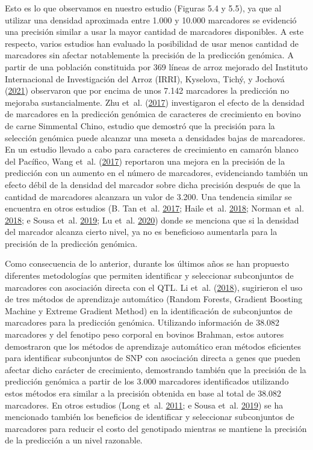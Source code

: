 \documentclass[11pt,spanish,a4paper,oneside,]{book} %
\begin{document}
Esto es lo que observamos en nuestro estudio (Figuras 5.4 y 5.5), ya que al utilizar una densidad aproximada entre 1.000 y 10.000 marcadores se evidenció una precisión similar a usar la mayor cantidad de marcadores disponibles. A este respecto, varios estudios han evaluado la posibilidad de usar menos cantidad de marcadores sin afectar notablemente la precisión de la predicción genómica. A partir de una población constituida por 369 líneas de arroz mejorado del Instituto Internacional de Investigación del Arroz (IRRI), Kyselova, Tichý, y Jochová (\protect\hyperlink{ref-cite:32}{2021}) observaron que por encima de unos 7.142 marcadores la predicción no mejoraba sustancialmente. Zhu et~al. (\protect\hyperlink{ref-cite:83}{2017}) investigaron el efecto de la densidad de marcadores en la predicción genómica de caracteres de crecimiento en bovino de carne Simmental Chino, estudio que demostró que la precisión para la selección genómica puede alcanzar una meseta a densidades bajas de marcadores. En un estudio llevado a cabo para caracteres de crecimiento en camarón blanco del Pacífico, Wang et~al. (\protect\hyperlink{ref-cite:82}{2017}) reportaron una mejora en la precisión de la predicción con un aumento en el número de marcadores, evidenciando también un efecto débil de la densidad del marcador sobre dicha precisión después de que la cantidad de marcadores alcanzara un valor de 3.200. Una tendencia similar se encuentra en otros estudios (B. Tan et~al. \protect\hyperlink{ref-cite:79}{2017}; Haile et~al. \protect\hyperlink{ref-cite:81}{2018}; Norman et~al. \protect\hyperlink{ref-cite:78}{2018}; e Sousa et~al. \protect\hyperlink{ref-cite:84}{2019}; Lu et~al. \protect\hyperlink{ref-cite:80}{2020}) donde se menciona que si la densidad del marcador alcanza cierto nivel, ya no es beneficioso aumentarla para la precisión de la predicción genómica.

Como consecuencia de lo anterior, durante los últimos años se han propuesto diferentes metodologías que permiten identificar y seleccionar subconjuntos de marcadores con asociación directa con el QTL. Li et~al. (\protect\hyperlink{ref-cite:85}{2018}), sugirieron el uso de tres métodos de aprendizaje automático (Random Forests, Gradient Boosting Machine y Extreme Gradient Method) en la identificación de subconjuntos de marcadores para la predicción genómica. Utilizando información de 38.082 marcadores y del fenotipo peso corporal en bovinos Brahman, estos autores demostraron que los métodos de aprendizaje automático eran métodos eficientes para identificar subconjuntos de SNP con asociación directa a genes que pueden afectar dicho carácter de crecimiento, demostrando también que la precisión de la predicción genómica a partir de los 3.000 marcadores identificados utilizando estos métodos era similar a la precisión obtenida en base al total de 38.082 marcadores. En otros estudios (Long et~al. \protect\hyperlink{ref-cite:86}{2011}; e Sousa et~al. \protect\hyperlink{ref-cite:84}{2019}) se ha mencionado también los beneficios de identificar y seleccionar subconjuntos de marcadores para reducir el costo del genotipado mientras se mantiene la precisión de la predicción a un nivel razonable.
\end{document}
